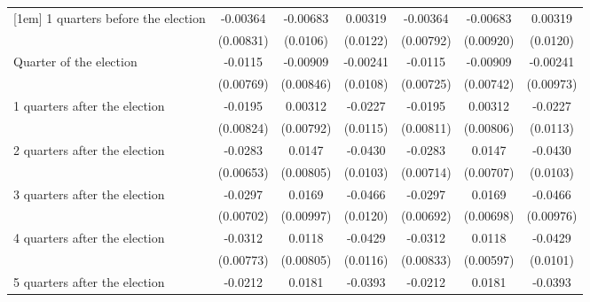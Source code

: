 \begin{table}[htbp]
\begin{tabular}{l*{6}{c}}
[1em]
 1 quarters before the election&    -0.00364         &    -0.00683         &     0.00319         &    -0.00364         &    -0.00683         &     0.00319         \\
                    &   (0.00831)         &    (0.0106)         &    (0.0122)         &   (0.00792)         &   (0.00920)         &    (0.0120)         \\
[1em]
Quarter of the election&     -0.0115         &    -0.00909         &    -0.00241         &     -0.0115         &    -0.00909         &    -0.00241         \\
                    &   (0.00769)         &   (0.00846)         &    (0.0108)         &   (0.00725)         &   (0.00742)         &   (0.00973)         \\
[1em]
 1 quarters after the election&     -0.0195\sym{*}  &     0.00312         &     -0.0227\sym{*}  &     -0.0195\sym{*}  &     0.00312         &     -0.0227\sym{*}  \\
                    &   (0.00824)         &   (0.00792)         &    (0.0115)         &   (0.00811)         &   (0.00806)         &    (0.0113)         \\
[1em]
 2 quarters after the election&     -0.0283\sym{***}&      0.0147         &     -0.0430\sym{***}&     -0.0283\sym{***}&      0.0147\sym{*}  &     -0.0430\sym{***}\\
                    &   (0.00653)         &   (0.00805)         &    (0.0103)         &   (0.00714)         &   (0.00707)         &    (0.0103)         \\
[1em]
 3 quarters after the election&     -0.0297\sym{***}&      0.0169         &     -0.0466\sym{***}&     -0.0297\sym{***}&      0.0169\sym{*}  &     -0.0466\sym{***}\\
                    &   (0.00702)         &   (0.00997)         &    (0.0120)         &   (0.00692)         &   (0.00698)         &   (0.00976)         \\
[1em]
 4 quarters after the election&     -0.0312\sym{***}&      0.0118         &     -0.0429\sym{***}&     -0.0312\sym{***}&      0.0118\sym{*}  &     -0.0429\sym{***}\\
                    &   (0.00773)         &   (0.00805)         &    (0.0116)         &   (0.00833)         &   (0.00597)         &    (0.0101)         \\
[1em]
 5 quarters after the election&     -0.0212\sym{**} &      0.0181         &     -0.0393\sym{***}&     -0.0212\sym{**} &      0.0181         &     -0.0393\sym{**} \\

\end{tabular}
\end{table}
